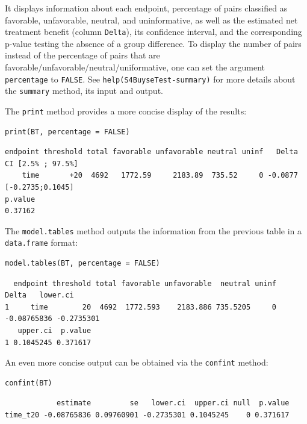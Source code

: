 \documentclass[12pt]{article}
\begin{document}
It displays information about each endpoint, percentage of pairs
classified as favorable, unfavorable, neutral, and uninformative, as
well as the estimated net treatment benefit (column \texttt{Delta}), its
confidence interval, and the corresponding p-value testing the absence
of a group difference. To display the number of pairs instead of the
percentage of pairs that are
favorable/unfavorable/neutral/uniformative, one can set the argument
\texttt{percentage} to \texttt{FALSE}. See \texttt{help(S4BuyseTest-summary)} for more
details about the \texttt{summary} method, its input and output.

\clearpage

The \texttt{print} method provides a more concise display of the results:
\lstset{language=r,label= ,caption= ,captionpos=b,numbers=none}
\begin{lstlisting}
print(BT, percentage = FALSE)
\end{lstlisting}

\begin{verbatim}
endpoint threshold total favorable unfavorable neutral uninf   Delta CI [2.5% ; 97.5%]
    time       +20  4692   1772.59     2183.89  735.52     0 -0.0877  [-0.2735;0.1045]
p.value
0.37162
\end{verbatim}


\bigskip

The \texttt{model.tables} method outputs the information from the previous
table in a \texttt{data.frame} format:

\lstset{language=r,label= ,caption= ,captionpos=b,numbers=none}
\begin{lstlisting}
model.tables(BT, percentage = FALSE)
\end{lstlisting}

\begin{verbatim}
  endpoint threshold total favorable unfavorable  neutral uninf       Delta   lower.ci
1     time        20  4692  1772.593    2183.886 735.5205     0 -0.08765836 -0.2735301
   upper.ci  p.value
1 0.1045245 0.371617
\end{verbatim}


\bigskip

An even more concise output can be obtained via the \texttt{confint} method:
\lstset{language=r,label= ,caption= ,captionpos=b,numbers=none}
\begin{lstlisting}
confint(BT)
\end{lstlisting}

\begin{verbatim}
            estimate         se   lower.ci  upper.ci null  p.value
time_t20 -0.08765836 0.09760901 -0.2735301 0.1045245    0 0.371617
\end{verbatim}
\end{document}
